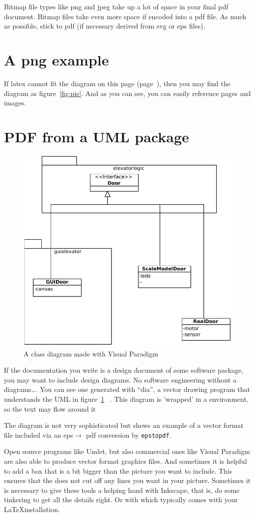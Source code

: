 Bitmap file types like png and jpeg take up a lot of space in your
final pdf document. 
Bitmap files take even more space if encoded into a pdf file.
As much as possible, stick to pdf (if necessary derived from svg or eps files). 


\section{A png example}
\label{page:pngexample}
If latex cannot fit the diagram on this page (page~\pageref{page:pngexample}), 
 then you may find the diagram as figure~\vref{fig:pie}. And as you
 can see, you can easily reference pages and images.

\section{PDF from a UML package} 
\label{sec:pdffromuml}
\begin{figure}
  \includegraphics[width=.4\textwidth]{images/doorsystem.pdf}
  \caption{A class diagram made with Visual Paradigm}
  \label{fig:classdiagram}
\end{figure}
If the documentation you write is a design document of some software
package, you may want to include design diagrams.
No software engineering without a  diagrams\ldots.
You can see one generated with ``dia'', a vector drawing program that
understands the UML in figure~\ref{fig:classdiagram}
~. This diagram is 'wrapped' in a  environment, so the text may flow around it

The diagram is not very sophisticated but shows an example of a vector
format file included via an eps$\rightarrow$ pdf conversion by
\texttt{epstopdf}.

Open source programs like Umlet, but also commercial ones like Visual Paradigm are also able to produce vector format graphics files. And sometimes it is helpful to add a box that is a bit bigger than the picture you want to include.
This ensures that the  does not cut off any lines
you want in your picture. Sometimes it is necessary to give these
tools a helping hand with Inkscape, that is, do some tinkering to
get all the details right. Or with  which typically comes with your \LaTeX installation.


